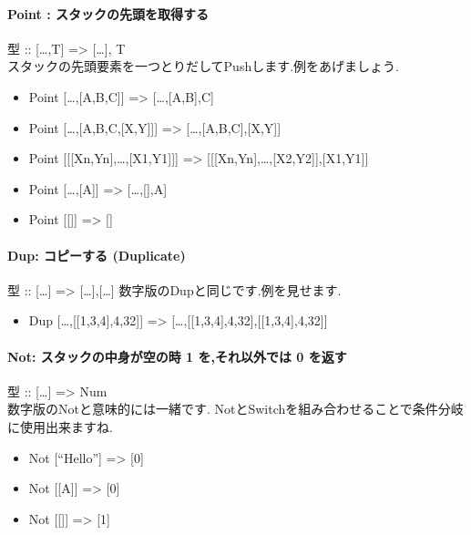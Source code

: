 \paragraph{Point : スタックの先頭を取得する}

型 :: {[}\ldots{},T{]} =\textgreater{} {[}\ldots{}{]},
T\\スタックの先頭要素を一つとりだしてPushします.例をあげましょう.

\begin{itemize}
\item
  Point {[}\ldots{},{[}A,B,C{]}{]} =\textgreater{}
  {[}\ldots{},{[}A,B{]},C{]}
\item
  Point {[}\ldots{},{[}A,B,C,{[}X,Y{]}{]}{]} =\textgreater{}
  {[}\ldots{},{[}A,B,C{]},{[}X,Y{]}{]}
\item
  Point {[}{[}{[}Xn,Yn{]},\ldots{},{[}X1,Y1{]}{]}{]} =\textgreater{}
  {[}{[}{[}Xn,Yn{]},\ldots{},{[}X2,Y2{]}{]},{[}X1,Y1{]}{]}
\item
  Point {[}\ldots{},{[}A{]}{]} =\textgreater{} {[}\ldots{},{[}{]},A{]}
\item
  Point {[}{[}{]}{]} =\textgreater{} {[}{]}
\end{itemize}

\paragraph{Dup: コピーする (Duplicate)}

型 :: {[}\ldots{}{]} =\textgreater{} {[}\ldots{}{]},{[}\ldots{}{]}
数字版のDupと同じです.例を見せます.

\begin{itemize}
\item
  Dup {[}\ldots{},{[}{[}1,3,4{]},4,32{]}{]} =\textgreater{}
  {[}\ldots{},{[}{[}1,3,4{]},4,32{]},{[}{[}1,3,4{]},4,32{]}{]}
\end{itemize}

\paragraph{Not: スタックの中身が空の時 1 を,それ以外では 0 を返す}

型 :: {[}\ldots{}{]} =\textgreater{}
Num\\数字版のNotと意味的には一緒です.
NotとSwitchを組み合わせることで条件分岐に使用出来ますね.

\begin{itemize}
\item
  Not {[}``Hello''{]} =\textgreater{} {[}0{]}
\item
  Not {[}{[}A{]}{]} =\textgreater{} {[}0{]}
\item
  Not {[}{[}{]}{]} =\textgreater{} {[}1{]}
\end{itemize}

